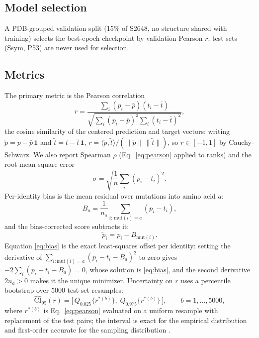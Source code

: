 \documentclass[11pt]{article}
\begin{document}
\subsection{Model selection}
A PDB-grouped validation split (15\% of S2648, no structure shared with
training) selects the best-epoch checkpoint by validation Pearson $r$;
test sets (Ssym, P53) are never used for selection.

\subsection{Metrics}
The primary metric is the Pearson correlation
\begin{equation}
r = \frac{\sum_i (p_i-\bar p)(t_i-\bar t)}{\sqrt{\sum_i (p_i-\bar p)^2 \sum_i (t_i-\bar t)^2}},
\label{eq:pearson}
\end{equation}
the cosine similarity of the centered prediction and target vectors:
writing $\tilde p = p-\bar p\,\mathbf 1$ and $\tilde t = t-\bar t\,\mathbf 1$,
$r = \langle\tilde p,\tilde t\rangle/(\|\tilde p\|\,\|\tilde t\|)$,
so $r\in[-1,1]$ by Cauchy--Schwarz. We also report Spearman $\rho$
(Eq.~\eqref{eq:pearson} applied to ranks) and the root-mean-square
error
\begin{equation}
\sigma=\sqrt{\frac{1}{n}\sum_i (p_i - t_i)^2}.
\label{eq:rmse}
\end{equation}
Per-identity bias is the mean residual over mutations into
amino acid $a$:
\begin{equation}
B_a = \frac{1}{n_a}\sum_{i:\,\mathrm{mut}(i)=a}(p_i - t_i),
\label{eq:bias}
\end{equation}
and the bias-corrected score subtracts it:
\begin{equation}
\tilde p_i = p_i - B_{\mathrm{mut}(i)}.
\label{eq:biascorr}
\end{equation}
Equation \eqref{eq:bias} is the exact least-squares offset per
identity: setting the derivative of
$\sum_{i:\mathrm{mut}(i)=a}(p_i-t_i-B_a)^2$ to zero gives
$-2\sum_i (p_i-t_i-B_a)=0$, whose solution is \eqref{eq:bias}, and the
second derivative $2n_a>0$ makes it the unique minimizer.
Uncertainty on $r$ uses a percentile bootstrap over $5000$ test-set
resamples:
\begin{equation}
\widehat{\mathrm{CI}}_{95}(r) = \big[\,Q_{0.025}\{r^{*(b)}\},\; Q_{0.975}\{r^{*(b)}\}\,\big],
\qquad b=1,\dots,5000,
\label{eq:bootstrap}
\end{equation}
where $r^{*(b)}$ is Eq.~\eqref{eq:pearson} evaluated on a uniform
resample with replacement of the test pairs; the interval is exact for
the empirical distribution and first-order accurate for the sampling
distribution \cite{efron1994}.
\end{document}

